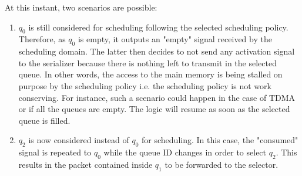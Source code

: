         At this instant, two scenarios are possible:
        \begin{enumerate}
            \item $q_{0}$ is still considered for scheduling following the selected scheduling policy. Therefore, as $q_{0}$ is empty, it outputs an "empty" signal received by the scheduling domain.
                  The latter then decides to not send any activation signal to the serializer because there is nothing left to transmit in the selected queue.
                  In other words, the access to the main memory is being stalled on purpose by the scheduling policy i.e. the scheduling policy is not work conserving.
                  For instance, such a scenario could happen in the case of TDMA or if all the queues are empty.
                  The logic will resume as soon as the selected queue is filled.
            \item $q_{2}$ is now considered instead of $q_{0}$ for scheduling.
                  In this case, the "consumed" signal is repeated to $q_{0}$ while the queue ID changes in order to select $q_{2}$.
                  This results in the packet contained inside $q_{1}$ to be forwarded to the selector.
        \end{enumerate}
